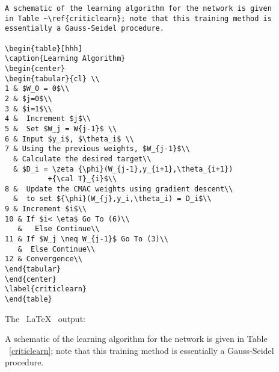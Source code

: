 \documentclass[11pt]{SelfArxOneColBMN}
\begin{document}
\singlespacing 
{}
\begin{lstlisting}
A schematic of the learning algorithm for the network is given 
in Table ~\ref{criticlearn}; note that this training method is
essentially a Gauss-Seidel procedure. 

\begin{table}[hhh]
\caption{Learning Algorithm}
\begin{center}
\begin{tabular}{cl} \\
1 & $W_0 = 0$\\
2 & $j=0$\\
3 & $i=1$\\
4 &  Increment $j$\\
5 &  Set $W_j = W{j-1}$ \\
6 & Input $y_i$, $\theta_i$ \\
7 & Using the previous weights, $W_{j-1}$\\
  & Calculate the desired target\\ 
  & $D_i = \zeta {\phi}(W_{j-1},y_{i+1},\theta_{i+1})
          +{\cal T}_{i}$\\
8 &  Update the CMAC weights using gradient descent\\
  &  to set ${\phi}(W_{j},y_i,\theta_i) = D_i$\\
9 & Increment $i$\\
10 & If $i< \eta$ Go To (6)\\
   &   Else Continue\\
11 & If $W_j \neq W_{j-1}$ Go To (3)\\
   &  Else Continue\\
12 & Convergence\\
\end{tabular}
\end{center}
\label{criticlearn}
\end{table}
\end{lstlisting}
\onehalfspacing
\lstset{fancyvrb=false}

\noindent
The ~\LaTeX~ output:

\noindent
A schematic of the learning algorithm for the network is given 
in Table ~\ref{criticlearn}; note that this training method is
essentially a Gauss-Seidel procedure. 
\end{document}
